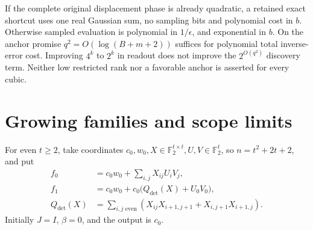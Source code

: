 \documentclass[11pt]{article}
\newcommand{\F}{\mathbb F_2}
\begin{document}
If the complete original displacement phase is already quadratic, a retained exact
shortcut uses one real Gaussian sum, no sampling bits and polynomial cost in $b$.
Otherwise sampled evaluation is polynomial in $1/\epsilon$, and exponential in $b$.
On the anchor promise $q^2=O(\log(B+m+2))$ suffices for polynomial total inverse-error
cost. Improving $4^k$ to $2^k$ in readout does not improve the $2^{O(q^2)}$ discovery
term. Neither low restricted rank nor a favorable anchor is asserted for every cubic.

\section{Growing families and scope limits}\label{sec:families}
For even $t\geq2$, take coordinates $c_0,w_0,X\in\F^{t\times t},U,V\in\F^t$,
so $n=t^2+2t+2$, and put
\begin{align}
 f_0&=c_0w_0+\sum_{i,j}X_{ij}U_iV_j,\nonumber\\
 f_1&=c_0w_0+c_0\big(Q_{\det}(X)+U_0V_0\big),\nonumber\\
 Q_{\det}(X)&=\sum_{i,j\text{ even}}
 (X_{ij}X_{i+1,j+1}+X_{i,j+1}X_{i+1,j}).\label{eq:family}
\end{align}
Initially $J=I$, $\beta=0$, and the output is $c_0$.
\end{document}
